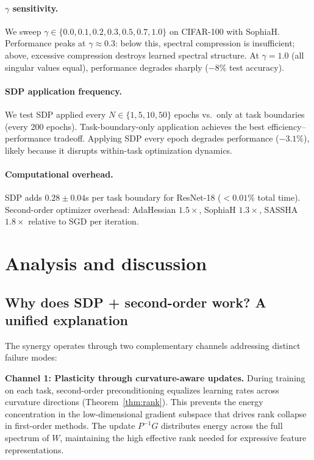 \documentclass{article}
\begin{document}
\paragraph{$\gamma$ sensitivity.} We sweep $\gamma \in \{0.0, 0.1, 0.2, 0.3, 0.5, 0.7, 1.0\}$ on CIFAR-100 with SophiaH. Performance peaks at $\gamma \approx 0.3$: below this, spectral compression is insufficient; above, excessive compression destroys learned spectral structure. At $\gamma = 1.0$ (all singular values equal), performance degrades sharply ($-8\%$ test accuracy).

\paragraph{SDP application frequency.} We test SDP applied every $N \in \{1, 5, 10, 50\}$ epochs vs.\ only at task boundaries (every 200 epochs). Task-boundary-only application achieves the best efficiency--performance tradeoff. Applying SDP every epoch degrades performance ($-3.1\%$), likely because it disrupts within-task optimization dynamics.

\paragraph{Computational overhead.} SDP adds $0.28 \pm 0.04$s per task boundary for ResNet-18 ($<0.01\%$ total time). Second-order optimizer overhead: AdaHessian $1.5\times$, SophiaH $1.3\times$, SASSHA $1.8\times$ relative to SGD per iteration.


\section{Analysis and discussion}
\label{sec:analysis}

\subsection{Why does SDP + second-order work? A unified explanation}

The synergy operates through two complementary channels addressing distinct failure modes:

\textbf{Channel 1: Plasticity through curvature-aware updates.} During training on each task, second-order preconditioning equalizes learning rates across curvature directions (Theorem~\ref{thm:rank}). This prevents the energy concentration in the low-dimensional gradient subspace that drives rank collapse in first-order methods. The update $P^{-1}G$ distributes energy across the full spectrum of $W$, maintaining the high effective rank needed for expressive feature representations.
\end{document}
